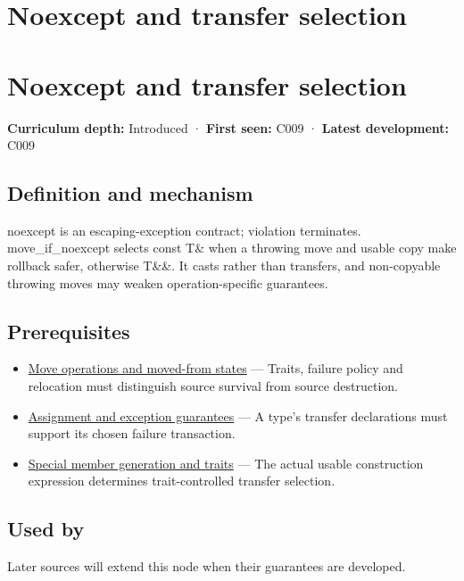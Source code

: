 \hypertarget{appendix-c746afaa47d1}{}
\section*{Noexcept and transfer selection}
\section{Noexcept and transfer selection}\label{noexcept-and-transfer-selection}

\textbf{Curriculum depth:} Introduced · \textbf{First seen:} C009 · \textbf{Latest development:} C009

\subsection{Definition and mechanism}\label{definition-and-mechanism}

noexcept is an escaping-exception contract; violation terminates. move\_if\_noexcept selects const T\& when a throwing move and usable copy make rollback safer, otherwise T\&\&. It casts rather than transfers, and non-copyable throwing moves may weaken operation-specific guarantees.

\subsection{Prerequisites}\label{prerequisites}

\begin{itemize}
\tightlist
\item
  \hyperref[appendix-5636651017c2]{Move operations and moved-from states} --- Traits, failure policy and relocation must distinguish source survival from source destruction.
\item
  \hyperref[appendix-bea6beb5350f]{Assignment and exception guarantees} --- A type's transfer declarations must support its chosen failure transaction.
\item
  \hyperref[appendix-42e02a12c694]{Special member generation and traits} --- The actual usable construction expression determines trait-controlled transfer selection.
\end{itemize}

\subsection{Used by}\label{used-by}

Later sources will extend this node when their guarantees are developed.

